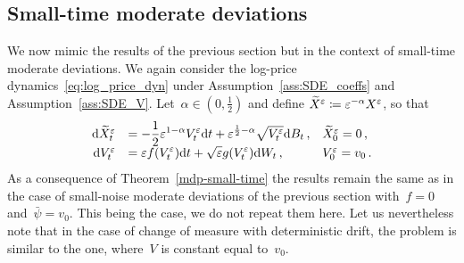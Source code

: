 


\subsection{Small-time moderate deviations}
We now mimic the results of the previous section but in the context of small-time moderate deviations. We again consider the log-price dynamics~\eqref{eq:log_price_dyn} under  Assumption~\ref{ass:SDE_coeffs} and Assumption~\ref{ass:SDE_V}.
Let~$\alpha \in (0,\frac{1}{2})$ and define 
${\widetilde{X}^\varepsilon \coloneqq \varepsilon^{-\alpha} X^{\varepsilon}}$, so that
\begin{equation*}
\begin{array}{rll}
\mathrm{d}\widetilde{X}^\varepsilon_t
&= \displaystyle -\frac{1}{2}\varepsilon^{1-\alpha} V_t^{\varepsilon} \mathrm{d} t + \varepsilon^{\frac{1}{2}-\alpha}\sqrt{V_t^\varepsilon}\mathrm{d} B_t\,, 
& \widetilde{X}_0^\varepsilon = 0\,, \\
\mathrm{d} V_t^\varepsilon &= \displaystyle\varepsilon f(V_t^\varepsilon)\mathrm{d} t + \sqrt{\varepsilon}g(V_t^\varepsilon)\mathrm{d} W_t\,,  & V_0^\varepsilon = v_0\,.
\end{array}
\end{equation*}
As a consequence of Theorem~\ref{mdp-small-time} the results remain the same as in the case of small-noise moderate deviations of the previous section with~$f = 0$ and~$\bar\psi = v_0$. This being the case, we do not repeat them here. Let us nevertheless note that in the case of change of measure with deterministic drift, the problem is similar to the one, where~$V$ is constant equal to~$v_0$.
